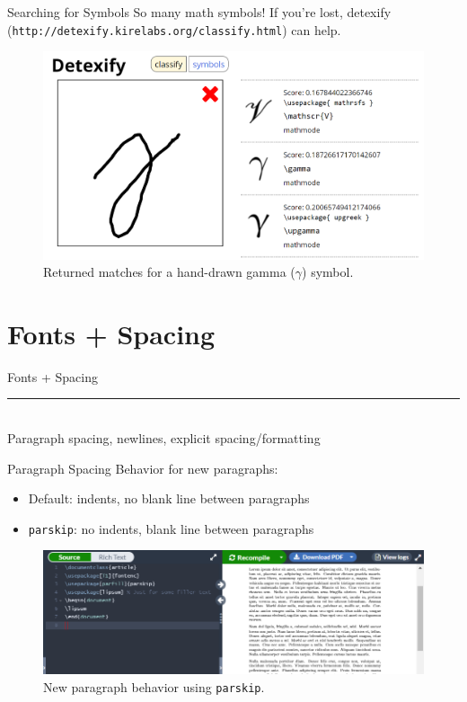 \documentclass{beamer}
\begin{document}
{  \begin{frame}{Searching for Symbols}
    So many math symbols! If you're lost, detexify (\texttt{http://detexify.kirelabs.org/classify.html}) can help.
    \begin{figure}
      \includegraphics[width=0.8\linewidth]{day02-01J-detexify.png}
      \caption{Returned matches for a hand-drawn gamma ($\gamma$) symbol.}
      \label{fig:day02-01J}
    \end{figure}
  \end{frame}

\section{Fonts + Spacing}

  \begin{frame}[plain]
    \vfill
    \centering
    \begin{beamercolorbox}[sep=8pt,center,shadow=true,rounded=true]{Fonts + Spacing}
      \insertsectionhead\par%
      \color{davisblue}\noindent\rule{10cm}{1pt} \\
      \footnotesize{Paragraph spacing, newlines, explicit spacing/formatting}
    \end{beamercolorbox}
    \vfill
  \end{frame}

  \begin{frame}{Paragraph Spacing}
    Behavior for new paragraphs:
    \begin{itemize}
      \item Default: indents, no blank line between paragraphs
      \item \texttt{parskip}: no indents, blank line between paragraphs
    \end{itemize}
    \begin{figure}
      \includegraphics[width=0.8\linewidth]{day02-02A-parskip.png}
      \caption{New paragraph behavior using \texttt{parskip}.}
      \label{fig:day02-02A}
    \end{figure}
  \end{frame}

}
\end{document}
